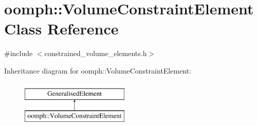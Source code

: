 \hypertarget{classoomph_1_1VolumeConstraintElement}{}\section{oomph\+:\+:Volume\+Constraint\+Element Class Reference}
\label{classoomph_1_1VolumeConstraintElement}


{\ttfamily \#include $<$constrained\+\_\+volume\+\_\+elements.\+h$>$}

Inheritance diagram for oomph\+:\+:Volume\+Constraint\+Element\+:\begin{figure}[H]
\begin{center}
\leavevmode
\includegraphics[height=2.000000cm]{classoomph_1_1VolumeConstraintElement}
\end{center}
\end{figure}
